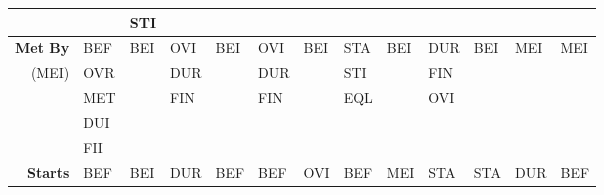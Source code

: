 \documentclass[11pt]{report}
\newenvironment{vvarmargin}[2]
{
  \begin{list}{}
  {
    \setlength{\topsep}{0pt}
    \setlength{\leftmargin}{0pt}
    \setlength{\rightmargin}{0pt}
    \setlength{\listparindent}{\parindent}
    \setlength{\itemindent}{\parindent}
    \setlength{\parsep}{0pt plus 1pt}
    \addtolength{\leftmargin}{#1}\addtolength{\rightmargin}{#2}
  }
  \item
}
{
  \end{list}
}
\begin{document}
\begin{table}[p]
\begin{vvarmargin}{-4cm}{-4cm}
\begin{center}
\begin{tabular}[t]{|r|l|l|l|l|l|l|l|l|l|l|l|l|}
                                          &                         & STI                     &                         &                         &                         &                         &                         &                         &                         &                         &                         &                         \\
                  \hline
                  \textbf{Met By}         & BEF                     & BEI                     & OVI                     & BEI                     & OVI                     & BEI                     & STA                     & BEI                     & DUR                     & BEI                     & MEI                     & MEI                     \\
                  (MEI)                   & OVR                     &                         & DUR                     &                         & DUR                     &                         & STI                     &                         & FIN                     &                         &                         &                         \\
                                          & MET                     &                         & FIN                     &                         & FIN                     &                         & EQL                     &                         & OVI                     &                         &                         &                         \\
                                          & DUI                     &                         &                         &                         &                         &                         &                         &                         &                         &                         &                         &                         \\
                                          & FII                     &                         &                         &                         &                         &                         &                         &                         &                         &                         &                         &                         \\
                  \hline
                  \textbf{Starts}         & BEF                     & BEI                     & DUR                     & BEF                     & BEF                     & OVI                     & BEF                     & MEI                     & STA                     & STA                     & DUR                     & BEF                     \\

\end{tabular}
\end{center}
\end{vvarmargin}
\end{table}
\end{document}

